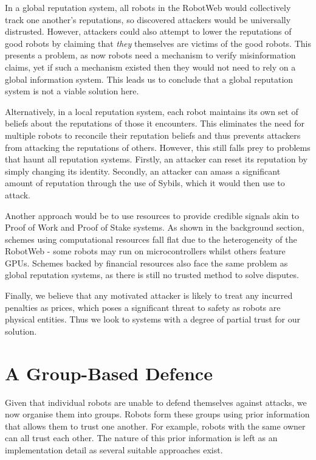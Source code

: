 In a global reputation system, all robots in the RobotWeb would collectively track one another's reputations, so discovered attackers would be universally distrusted. However, attackers could also attempt to lower the reputations of good robots by claiming that \textit{they} themselves are victims of the good robots. This presents a problem, as now robots need a mechanism to verify misinformation claims, yet if such a mechanism existed then they would not need to rely on a global information system. This leads us to conclude that a global reputation system is not a viable solution here.

Alternatively, in a local reputation system, each robot maintains its own set of beliefs about the reputations of those it encounters. This eliminates the need for multiple robots to reconcile their reputation beliefs and thus prevents attackers from attacking the reputations of others. However, this still falls prey to problems that haunt all reputation systems. Firstly, an attacker can reset its reputation by simply changing its identity. Secondly, an attacker can amass a significant amount of reputation through the use of Sybils, which it would then use to attack.

Another approach would be to use resources to provide credible signals akin to Proof of Work and Proof of Stake systems. As shown in the background section, schemes using computational resources fall flat due to the heterogeneity of the RobotWeb - some robots may run on microcontrollers whilst others feature GPUs. Schemes backed by financial resources also face the same problem as global reputation systems, as there is still no trusted method to solve disputes.

Finally, we believe that any motivated attacker is likely to treat any incurred penalties as prices, which poses a significant threat to safety as robots are physical entities. Thus we look to systems with a degree of partial trust for our solution.

\section{A Group-Based Defence}
Given that individual robots are unable to defend themselves against attacks, we now organise them into groups. Robots form these groups using prior information that allows them to trust one another. For example, robots with the same owner can all trust each other. The nature of this prior information is left as an implementation detail as several suitable approaches exist. %

